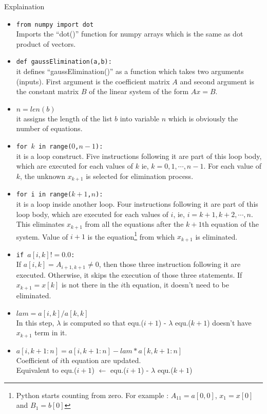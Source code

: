 \begin{remark}Explaination
\begin{commentary}
\begin{itemize}
	\item \texttt{from numpy import dot} \\ Imports the ``dot()'' function for numpy arrays which is the same as dot product of vectors.
	\item \texttt{def gaussElimination(a,b):}\\ it defines ``gaussElimination()'' as a function which takes two arguments (inputs). First argument is the coefficient matrix $A$ and second argument is the constant matrix $B$ of the linear system of the form $Ax = B$.
	\item \texttt{$n = len(b)$}\\ it assigns the length of the list $b$ into variable $n$ which is obviously the number of equations.
	\item \texttt{for $k$ in range($0$,$n-1$):}  \\ it is a loop construct. Five instructions following it are part of this loop body, which are executed for each values of $k$ ie, $k = 0, 1, \cdots, n-1$. For each value of $k$, the unknown $x_{k+1}$ is selected for elimination process.
	\item \texttt{for i in range($k+1$,$n$):}\\ it is a loop inside another loop. Four instructions following it are part of this loop body, which are executed for each values of $i$, ie, $i = k+1, k+2, \cdots, n$. This eliminates $x_{k+1}$ from all the equations after the $k+1$th equation of the system. Value of $i+1$ is the equation\footnote{Python starts counting from zero. For example : $A_{11} = a[0,0]$, $x_1 = x[0]$ and $B_1 = b[0]$} from which $x_{k+1}$ is eliminated.
	\item \texttt{if $a[i,k] != 0.0$:} \\ If $a[i,k] = A_{i+1,k+1} \ne 0$, then those three instruction following it are executed. Otherwise, it skips the execution of those three statements. If $x_{k+1}=x[k]$ is not there in the $i$th equation, it doesn't need to be eliminated.
	\item \texttt{$lam = a[i,k]/a[k,k]$} \\ In this step, $\lambda$ is computed so that equ.($i+1$) - $\lambda$ equ.($k+1$) doesn't have $x_{k+1}$ term in it.
	\item \texttt{$a[i,k+1:n] = a[i,k+1:n]-lam*a[k,k+1:n]$} \\ Coefficient of $i$th equation are updated.\\ Equivalent to equ.($i+1$) $\leftarrow$ equ.($i+1$) - $\lambda$ equ.($k+1$)

\end{itemize}
\end{commentary}
\end{remark}
